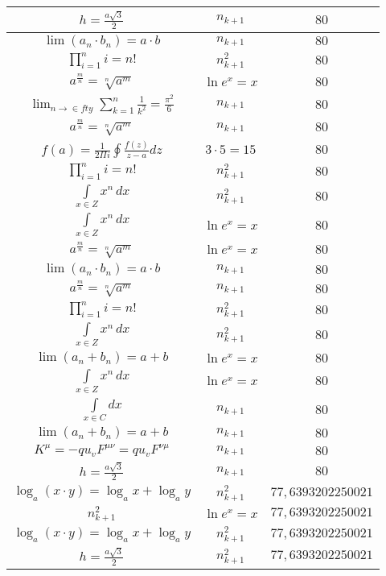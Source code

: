\documentclass{article}
\begin{document}
\begin{flushleft}
\begin{longtable}{|c|c|c|}
$h=\frac{a\sqrt{3}}{2}$ & $n_{k+1}$ & $80$ \\ \hline 
$\lim\left(a_n\cdot b_n\right)=a\cdot b$ & $n_{k+1}$ & $80$ \\ \hline 
$\prod_{i=1}^ni=n!$ & $n_{k+1}^2$ & $80$ \\ \hline 
$a^{\frac{m}{n}}=\sqrt[n]{a^{m}}$ & $\ln e^x=x$ & $80$ \\ \hline 
$\lim_{n\to\in fty}\sum_{k=1}^n\frac{1}{k^2}=\frac{\pi^2}{6}$ & $n_{k+1}$ & $80$ \\ \hline 
$a^{\frac{m}{n}}=\sqrt[n]{a^{m}}$ & $n_{k+1}$ & $80$ \\ \hline 
$f\left(a\right)=\frac{1}{2\Pi i}\oint\frac{f\left(z\right)}{z-a}dz$ & $3\cdot 5=15$ & $80$ \\ \hline 
$\prod_{i=1}^ni=n!$ & $n_{k+1}^2$ & $80$ \\ \hline 
$\int \limits_{x\in Z}\!x^{n}\,dx$ & $n_{k+1}^2$ & $80$ \\ \hline 
$\int \limits_{x\in Z}\!x^{n}\,dx$ & $\ln e^x=x$ & $80$ \\ \hline 
$a^{\frac{m}{n}}=\sqrt[n]{a^{m}}$ & $\ln e^x=x$ & $80$ \\ \hline 
$\lim\left(a_n\cdot b_n\right)=a\cdot b$ & $n_{k+1}$ & $80$ \\ \hline 
$a^{\frac{m}{n}}=\sqrt[n]{a^{m}}$ & $n_{k+1}$ & $80$ \\ \hline 
$\prod_{i=1}^ni=n!$ & $n_{k+1}^2$ & $80$ \\ \hline 
$\int \limits_{x\in Z}\!x^{n}\,dx$ & $n_{k+1}^2$ & $80$ \\ \hline 
$\lim\left(a_n+b_n\right)=a+b$ & $\ln e^x=x$ & $80$ \\ \hline 
$\int \limits_{x\in Z}\!x^{n}\,dx$ & $\ln e^x=x$ & $80$ \\ \hline 
$\int \limits_{x\in C}dx$ & $n_{k+1}$ & $80$ \\ \hline 
$\lim\left(a_n+b_n\right)=a+b$ & $n_{k+1}$ & $80$ \\ \hline 
$K^\mu=-qu_vF^{\mu\nu}=qu_vF^{\nu\mu}$ & $n_{k+1}$ & $80$ \\ \hline 
$h=\frac{a\sqrt{3}}{2}$ & $n_{k+1}$ & $80$ \\ \hline 
$\log_{a}(x\cdot y)=\log_{a}x+\log_{a}y$ & $n_{k+1}^2$ & $77,6393202250021$ \\ \hline 
$n_{k+1}^2$ & $\ln e^x=x$ & $77,6393202250021$ \\ \hline 
$\log_{a}(x\cdot y)=\log_{a}x+\log_{a}y$ & $n_{k+1}^2$ & $77,6393202250021$ \\ \hline 
$h=\frac{a\sqrt{3}}{2}$ & $n_{k+1}^2$ & $77,6393202250021$ \\ \hline 

\end{longtable}
\end{flushleft}
\end{document}
